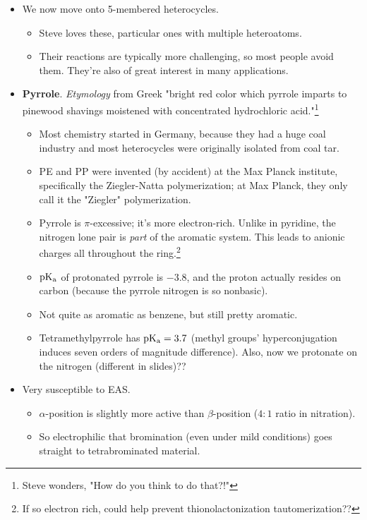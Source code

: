 \documentclass[../notes.tex]{subfiles}
\begin{document}
\begin{itemize}
\begin{itemize}
    \end{itemize}
    \item We now move onto 5-membered heterocycles.
    \begin{itemize}
        \item Steve loves these, particular ones with multiple heteroatoms.
        \item Their reactions are typically more challenging, so most people avoid them. They're also of great interest in many applications.
    \end{itemize}
    \item \textbf{Pyrrole}. \emph{Etymology} from Greek "bright red color which pyrrole imparts to pinewood shavings moistened with concentrated hydrochloric acid."\footnote{Steve wonders, "How do you think to do that?!"}
    \begin{itemize}
        \item Most chemistry started in Germany, because they had a huge coal industry and most heterocycles were originally isolated from coal tar.
        \item PE and PP were invented (by accident) at the Max Planck institute, specifically the Ziegler-Natta polymerization; at Max Planck, they only call it the "Ziegler" polymerization.
        \item Pyrrole is $\pi$-excessive; it's more electron-rich. Unlike in pyridine, the nitrogen lone pair is \emph{part} of the aromatic system. This leads to anionic charges all throughout the ring.\footnote{If so electron rich, could help prevent thionolactonization tautomerization??}
        \item $\operatorname{\text{p}K_\text{a}}$ of protonated pyrrole is $-3.8$, and the proton actually resides on carbon (because the pyrrole nitrogen is so nonbasic).
        \item Not quite as aromatic as benzene, but still pretty aromatic.
        \item Tetramethylpyrrole has $\operatorname{\text{p}K_\text{a}}=3.7$ (methyl groups' hyperconjugation induces seven orders of magnitude difference). Also, now we protonate on the nitrogen (different in slides)??
    \end{itemize}
    \item Very susceptible to EAS.
    \begin{itemize}
        \item $\alpha$-position is slightly more active than $\beta$-position ($4:1$ ratio in nitration).
        \item So electrophilic that bromination (even under mild conditions) goes straight to tetrabrominated material.

\end{itemize}
\end{itemize}
\end{document}
